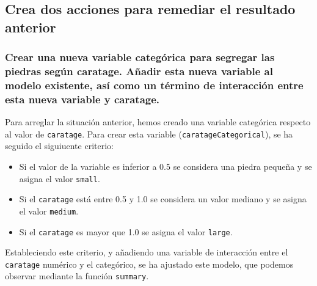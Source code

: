 \documentclass[a4paper, 7pt]{article}
\begin{document}
\subsection{Crea dos acciones para remediar el resultado anterior}
\label{subsec:question-3}

\subsubsection{Crear una nueva variable categórica para segregar las piedras según caratage. Añadir esta nueva variable al modelo existente, así como un término de interacción entre esta nueva variable y caratage.}

Para arreglar la situación anterior, hemos creado una variable categórica respecto al valor de \texttt{caratage}. Para crear esta variable (\texttt{caratageCategorical}), se ha seguido el siguiuente criterio:

\begin{itemize}
    \item Si el valor de la variable es inferior a 0.5 se considera una piedra pequeña y se asigna el valor \texttt{small}.
    \item Si el \texttt{caratage} está entre 0.5 y 1.0 se considera un valor mediano y se asigna el valor \texttt{medium}.
    \item Si el \texttt{caratage} es mayor que 1.0 se asigna el valor \texttt{large}.
\end{itemize}

Estableciendo este criterio, y añadiendo una variable de interacción entre el \texttt{caratage} numérico y el categórico, se ha ajustado este modelo, que podemos observar mediante la función \texttt{summary}.
\end{document}
